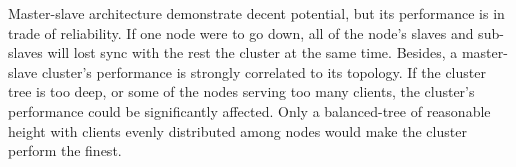 Master-slave architecture demonstrate decent potential, but its performance is in trade of reliability. If one node were to go down, all of the node's slaves and sub-slaves will lost sync with the rest the cluster at the same time. Besides, a master-slave cluster's performance is strongly correlated to its topology. If the cluster tree is too deep, or some of the nodes serving too many clients, the cluster's performance could be significantly affected. Only a balanced-tree of reasonable height with clients evenly distributed among nodes would make the cluster perform the finest. 
\